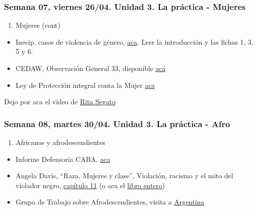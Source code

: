 \documentclass[
]{article}
\providecommand{\tightlist}{%
  \setlength{\itemsep}{0pt}\setlength{\parskip}{0pt}}
\begin{document}
\hypertarget{semana-07-viernes-2604.-unidad-3.-la-pruxe1ctica---mujeres}{%
\subsubsection{Semana 07, viernes 26/04. Unidad 3. La práctica -
Mujeres}\label{semana-07-viernes-2604.-unidad-3.-la-pruxe1ctica---mujeres}}

\begin{enumerate}
\def\labelenumi{\alph{enumi}.}
\setcounter{enumi}{4}
\tightlist
\item
  Mujeres (cont)
\end{enumerate}

\begin{itemize}
\item
  Inecip, casos de violencia de género,
  \href{https://inecip.org/publicaciones/herramientas-jurisprudenciales-para-el-litigio-con-perspectiva-de-genero/}{aca}.
  Leer la introducción y las fichas 1, 3, 5 y 6.
\item
  CEDAW, Observación General 33, disponible
  \href{https://drive.google.com/file/d/1j3suY4Q3JhS5EzbAvs6_K6XSbQsOQ7D7/view?usp=sharing}{acá}
\item
  Ley de Protección integral conta la Mujer
  \href{http://servicios.infoleg.gob.ar/infolegInternet/anexos/150000-154999/152155/texact.htm}{aca}
\end{itemize}

Dejo por aca el video de \href{https://youtu.be/prUqWHKnUd4}{Rita
Segato}

\hypertarget{semana-08-martes-3004.-unidad-3.-la-pruxe1ctica---afro}{%
\subsubsection{Semana 08, martes 30/04. Unidad 3. La práctica -
Afro}\label{semana-08-martes-3004.-unidad-3.-la-pruxe1ctica---afro}}

\begin{enumerate}
\def\labelenumi{\alph{enumi}.}
\setcounter{enumi}{4}
\tightlist
\item
  Africanos y afrodescendientes
\end{enumerate}

\begin{itemize}
\item
  Informe Defensoria CABA,
  \href{https://drive.google.com/file/d/1vIoZ7GBl8fwXbZWhqoCxqOHsHMvP7Dki/view?usp=sharing}{aca}
\item
  Angela Davis, ``Raza, Mujeres y clase'', Violación, racismo y el mito
  del violador negro,
  \href{https://drive.google.com/file/d/1ghSHi12WUBBQlkcBQYiA5--Z_rGMnndc/view?usp=sharing}{capítulo
  11} (o aca el
  \href{https://drive.google.com/file/d/1dKW89DDQlKGgsKIE74Mi7i6pnmdTvDxn/view?usp=sharing}{libro
  entero})
\item
  Grupo de Trabajo sobre Afrodescendientes, visita a
  \href{http://daccess-ods.un.org/access.nsf/Get?Open\&DS=A/HRC/42/59/Add.2\&Lang=S}{Argentina}
\end{itemize}
\end{document}
